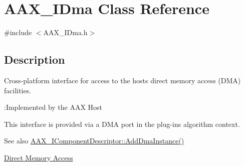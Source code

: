 \hypertarget{a00095}{}\section{A\+A\+X\+\_\+\+I\+Dma Class Reference}
\label{a00095}


{\ttfamily \#include $<$A\+A\+X\+\_\+\+I\+Dma.\+h$>$}



\subsection{Description}
Cross-\/platform interface for access to the host\textquotesingle{}s direct memory access (D\+M\+A) facilities. 

\begin{DoxyRefDesc}{\+:\+Implemented by the A\+A\+X Host}
\item[\hyperlink{a00001__aax_host_implementation000005}{\+:\+Implemented by the A\+A\+X Host}]\end{DoxyRefDesc}


This interface is provided via a D\+M\+A port in the plug-\/in\textquotesingle{}s algorithm context.

\begin{DoxySeeAlso}{See also}
\hyperlink{a00088_aff9e1c726bbdf500f2d61b164589744e}{A\+A\+X\+\_\+\+I\+Component\+Descriptor\+::\+Add\+Dma\+Instance()} 

\hyperlink{a00340}{Direct Memory Access} 
\end{DoxySeeAlso}
